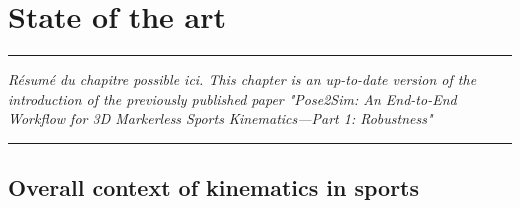 
\lhead[\fancyplain{}{\leftmark}]%
      {\fancyplain{}{}} %
\chead[\fancyplain{}{}]%
      {\fancyplain{}{}}
\rhead[\fancyplain{}{}]%
      {\fancyplain{}{\rightmark}}%
\lfoot[\fancyplain{}{}]%
      {\fancyplain{}{}}
\cfoot[\fancyplain{}{\thepage}]%
      {\fancyplain{}{\thepage}} %
\rfoot[\fancyplain{}{}]%
     {\fancyplain{}{\scriptsize}}



\chapter{State of the art}
\label{ch:1}


\begin{center}
\rule{0.7\linewidth}{.5pt}
\begin{minipage}{0.7\linewidth}
\smallskip

\textit{Résumé du chapitre possible ici.\newline \newline
This chapter is an up-to-date version of the introduction of the previously published paper "Pose2Sim: An End-to-End Workflow for 3D Markerless Sports Kinematics—Part 1: Robustness" \cite{Pagnon_2021} }

\end{minipage}
\smallskip
\rule{0.7\linewidth}{.5pt}
\end{center}

\minitoc
\newpage



\section{Overall context of kinematics in sports}

